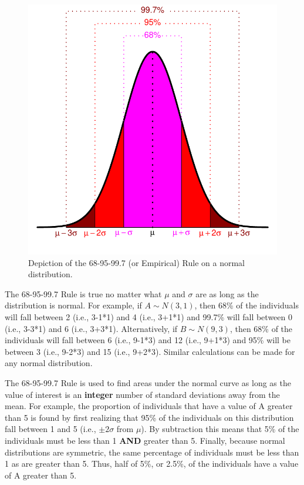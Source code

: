 \documentclass[10pt,openany]{book}\usepackage[]{graphicx}\usepackage[]{color}
\newenvironment{knitrout}{}{} %
\begin{document}
\begin{knitrout}
\color{fgcolor}\begin{figure}[hbtp]

{\centering \includegraphics[width=.5\linewidth]{Figs/NormEmpiricalRule-1} 

}

\caption[Depiction of the 68-95-99.7 (or Empirical) Rule on a normal distribution]{Depiction of the 68-95-99.7 (or Empirical) Rule on a normal distribution.}\label{fig:NormEmpiricalRule}
\end{figure}


\end{knitrout}

\vspace{12pt} %
The 68-95-99.7 Rule is true no matter what $\mu$ and $\sigma$ are as long as the distribution is normal. For example, if $A\sim N(3,1)$, then 68\% of the individuals will fall between 2 (i.e., 3-1*1) and 4 (i.e., 3+1*1) and 99.7\% will fall between 0 (i.e., 3-3*1) and 6 (i.e., 3+3*1). Alternatively, if $B\sim N(9,3)$, then 68\% of the individuals will fall between 6 (i.e., 9-1*3) and 12 (i.e., 9+1*3) and 95\% will be between 3 (i.e., 9-2*3) and 15 (i.e., 9+2*3). Similar calculations can be made for any normal distribution.

The 68-95-99.7 Rule is used to find areas under the normal curve as long as the value of interest is an \textbf{integer} number of standard deviations away from the mean. For example, the proportion of individuals that have a value of A greater than 5  is found by first realizing that 95\% of the individuals on this distribution fall between 1 and 5 (i.e., $\pm2\sigma$ from $\mu$). By subtraction this means that 5\% of the individuals must be less than 1 \textbf{AND} greater than 5. Finally, because normal distributions are symmetric, the same percentage of individuals must be less than 1 as are greater than 5. Thus, half of 5\%, or 2.5\%, of the individuals have a value of A greater than 5.
\end{document}
